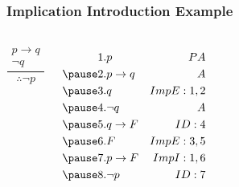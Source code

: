 \documentclass[dvipsnames]{beamer}
\begin{document}
\begin{frame}
  \frametitle{Implication Introduction Example}

  \begin{example}
    \begin{columns}
      \[
      \frac
        {
          \begin{array}{c}
            p \rightarrow q\\
            \neg q
          \end{array}
        }
        {
          \therefore \neg p
        }
      \]

      \pause
      \begin{eqnarray*}
        1. & p                         & PA\\
        \pause
        2. & p \rightarrow q           & A\\
        \pause
        3. & q                         & ImpE:1,2\\
        \pause
        4. & \neg q                    & A\\
        \pause
        5. & q \rightarrow F           & ID:4\\
        \pause
        6. & F                         & ImpE:3,5\\
        \pause
        7. & p \rightarrow F           & ImpI:1,6\\
        \pause
        8. & \neg p                    & ID:7\\
      \end{eqnarray*}
    \end{columns}
  \end{example}
\end{frame}
\end{document}
